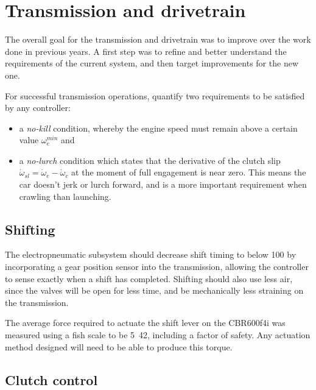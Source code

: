 \section{Transmission and drivetrain}

The overall goal for the transmission and drivetrain was to improve over the work done in previous years. A first step was to refine and better understand the requirements of the current system, and then target improvements for the new one.

For successful transmission operations, \citet{clutch_control} quantify two requirements to be satisfied by any controller:
\begin{itemize}
  \item a \emph{no-kill} condition, whereby the engine speed must remain above a certain value $\omega_e^{min}$ and
  \item a \emph{no-lurch} condition which states that the derivative of the clutch slip $\dot{\omega}_{sl}=\dot{\omega}_e-\dot{\omega}_c$ at the moment of full engagement is near zero. This means the car doesn't jerk or lurch forward, and is a more important requirement when crawling than launching.
\end{itemize}


\subsection{Shifting}

The electropneumatic subsystem should decrease shift timing to below \unit{100}{\milli\second} by incorporating a gear position sensor into the transmission, allowing the controller to sense exactly when a shift has completed. Shifting should also use less air, since the valves will be open for less time, and be mechanically less straining on the transmission.

The average force required to actuate the shift lever on the CBR600f4i was measured using a fish scale to be \unit{5.42}{\newton\metre}, including a factor of safety. Any actuation method designed will need to be able to produce this torque.

\subsection{Clutch control}

